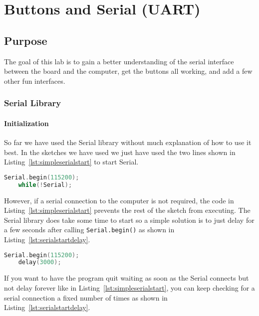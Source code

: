\chapter{Buttons and Serial (UART)}

\section{Purpose}
The goal of this lab is to gain a better understanding of the serial interface between
the board and the computer, get the buttons all working, and add a few other fun interfaces.

\subsection{Serial Library}
\subsubsection{Initialization}
So far we have used the Serial library without much explanation of how to use it best.
In the sketches we have used we just have used the two lines shown in 
Listing~\ref{lst:simpleserialstart} to start Serial.

\begin{lstlisting}[language=C++, caption={If serial is required for a sketch this method of 
    starting Serial blocks until a serial monitor is started.},label={lst:simpleserialstart}]
    Serial.begin(115200);
    while(!Serial);
\end{lstlisting}

However, if a serial connection to the computer is not required, the code in 
Listing~\ref{lst:simpleserialstart} prevents the rest of the sketch from executing. The Serial
library does take some time to start so a simple solution is to just delay for a few seconds
after calling \lstinline$Serial.begin()$ as shown in Listing~\ref{lst:serialstartdelay}.

\begin{lstlisting}[language=C++, caption={If serial is not required for a sketch this method of 
    starting Serial waits a bit in hopes it connects.},label={lst:serialstartdelay}]
    Serial.begin(115200);
    delay(3000);
\end{lstlisting}

If you want to have the program quit waiting as soon as the Serial connects but not delay forever
like in Listing~\ref{lst:simpleserialstart}, you can keep checking for a serial connection a fixed
number of times as shown in Listing~\ref{lst:serialstartdelay}.

